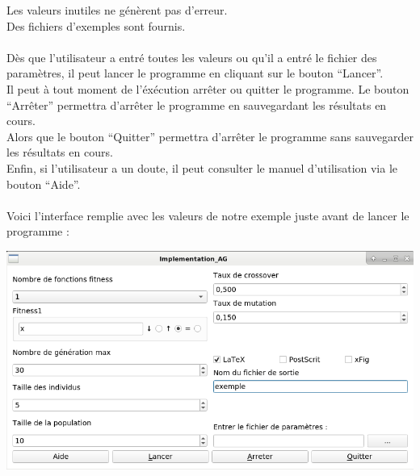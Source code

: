 \documentclass[a4paper,11pt]{article}
\begin{document}
			Les valeurs inutiles ne génèrent pas d'erreur.\\
			Des fichiers d'exemples sont fournis.\\\\
			Dès que l’utilisateur a entré toutes les valeurs ou qu’il a entré le fichier des paramètres, il peut lancer le programme en cliquant sur le bouton “Lancer”.\\
			Il peut à tout moment de l'éxécution arrêter ou quitter le programme. Le bouton “Arrêter” permettra d’arrêter le programme en sauvegardant les résultats en cours.\\
			Alors que le bouton “Quitter” permettra d’arrêter le programme sans sauvegarder les résultats en cours.\\
			Enfin, si l’utilisateur a un doute, il peut consulter le manuel d’utilisation via le bouton “Aide”.\\\\
			Voici l’interface remplie avec les valeurs de notre exemple juste avant de lancer le programme :\\
			\centerline{\includegraphics[scale=0.5]{Interface.png}}
			
\end{document}
